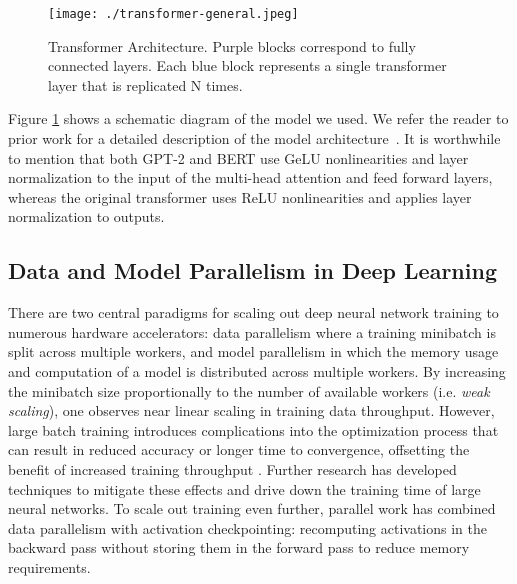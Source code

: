 \documentclass{article}
\begin{document}
\begin{figure}[t!]
\vspace{-2mm}
\begin{center}
  \texttt{[image: ./transformer-general.jpeg]}
  \vspace{-2mm}
  \caption{Transformer Architecture. Purple blocks correspond to fully connected layers. Each blue block represents a single transformer layer that is replicated N times.}
  \label{fig:gpt2-transformer}
\end{center}
\vspace{-6mm}
\end{figure}

Figure \ref{fig:gpt2-transformer} shows a schematic diagram of the model we used. We refer the reader to prior work for a detailed description of the model architecture~\citep{Transformer,devlin2018bert,Radford2019GPT2}. It is worthwhile to mention that both GPT-2 and BERT use GeLU \citep{gelu} nonlinearities and layer normalization \citep{layernorm} to the input of the multi-head attention and feed forward layers, whereas the original transformer \citep{Transformer} uses ReLU nonlinearities and applies layer normalization to outputs.

\subsection{Data and Model Parallelism in Deep Learning} 

There are two central paradigms for scaling out deep neural network training to numerous hardware accelerators: data parallelism \cite{DataParallel1990} where a training minibatch is split across multiple workers, and model parallelism in which the memory usage and computation of a model is distributed across multiple workers. By increasing the minibatch size proportionally to the number of available workers (i.e. \emph{weak scaling}), one observes near linear scaling in training data throughput. However, large batch training introduces complications into the optimization process that can result in reduced accuracy or longer time to convergence, offsetting the benefit of increased training throughput \cite{LargeBatch2016}. Further research \cite{Goyal2017, Lars2017, Lamb2019} has developed techniques to mitigate these effects and drive down the training time of large neural networks. To scale out training even further, parallel work \cite{activation_checkpointing} has combined data parallelism with activation checkpointing: recomputing activations in the backward pass without storing them in the forward pass to reduce memory requirements. 
\end{document}
